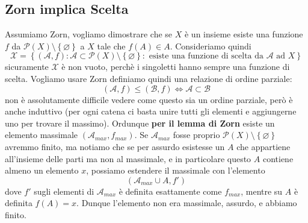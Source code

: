 \documentclass[11pt]{scrartcl}
\newcommand{\eset}{\varnothing}
\newcommand{\parti}{\mathcal{P}}
\begin{document}
  \subsection{Zorn implica Scelta}
  
  Assumiamo Zorn, vogliamo dimostrare che se $X$ è un insieme esiste una funzione $f$ da $\parti(X)\setminus\left\{\eset\right\}$ a $X$ tale che $f(A)\in A$. Consideriamo quindi
  $$\mathcal{X}=\left\{(\mathcal{A},f):\mathcal{A}\subset \parti(X)\setminus\left\{\eset\right\}:\text{ esiste una funzione di scelta da $\mathcal{A}$ ad $X$}\right\}$$
  sicuramente $\mathcal{X}$ è non vuoto, perchè i singoletti hanno sempre una funzione di scelta. Vogliamo usare Zorn definiamo quindi una relazione di ordine parziale:
  $$(\mathcal{A},f)\le (\mathcal{B},f) \iff \mathcal{A} \subset \mathcal{B}$$
  non è assolutamente difficile vedere come questo sia un ordine parziale, però è anche induttivo (per ogni catena ci basta unire tutti gli elementi e aggiungerne uno per trovare il massimo). Ordunque \textbf{per il lemma di Zorn} esiste un elemento massimale $(\mathcal{A}_{max},f_{max})$. Se $\mathcal{A}_{max}$ fosse proprio $\parti(X)\setminus \left\{\eset\right\}$ avremmo finito, ma notiamo che se per assurdo esistesse un $A$ che appartiene all'insieme delle parti ma non al massimale, e in particolare questo $A$ contiene almeno un elemento $x$, possiamo estendere il massimale con l'elemento
  $$(\mathcal{A}_{max}\cup A,f')$$
  dove $f'$ sugli elementi di $\mathcal{A}_{max}$ è definita esattamente come $f_{max}$, mentre su $A$ è definita $f(A)=x$. Dunque l'elemento non era massimale, assurdo, e abbiamo finito.
  
\end{document}
